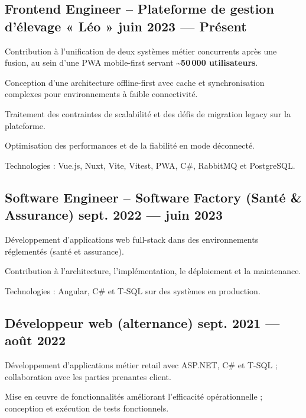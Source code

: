 \subsection{{Frontend Engineer – Plateforme de gestion d'élevage « Léo » \hfill juin 2023 --- Présent}}
\begin{zitemize}
    \item Contribution à l'unification de deux systèmes métier concurrents après une fusion, au sein d'une PWA mobile-first servant \textbf{\textasciitilde50\,000 utilisateurs}.
    \item Conception d'une architecture offline-first avec cache et synchronisation complexes pour environnements à faible connectivité.
    \item Traitement des contraintes de scalabilité et des défis de migration legacy sur la plateforme.
    \item Optimisation des performances et de la fiabilité en mode déconnecté.
    \item Technologies : Vue.js, Nuxt, Vite, Vitest, PWA, C\#, RabbitMQ et PostgreSQL.
\end{zitemize}

\subsection{{Software Engineer – Software Factory (Santé \& Assurance) \hfill sept. 2022 --- juin 2023}}
\begin{zitemize}
    \item Développement d'applications web full-stack dans des environnements réglementés (santé et assurance).
    \item Contribution à l'architecture, l'implémentation, le déploiement et la maintenance.
    \item Technologies : Angular, C\# et T-SQL sur des systèmes en production.
\end{zitemize}

\subsection{{Développeur web (alternance) \hfill sept. 2021 --- août 2022}}
\begin{zitemize}
    \item Développement d'applications métier retail avec ASP.NET, C\# et T-SQL ; collaboration avec les parties prenantes client.
    \item Mise en œuvre de fonctionnalités améliorant l'efficacité opérationnelle ; conception et exécution de tests fonctionnels.
\end{zitemize}
